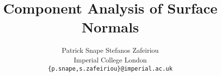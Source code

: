 \documentclass{article} %
\title{Component Analysis of Surface Normals}
\author{
Patrick Snape \qquad Stefanos Zafeiriou\\
Imperial College London\\
\texttt{\{p.snape,s.zafeiriou\}@imperial.ac.uk}
}
\begin{document}
\maketitle





{\small


}
\end{document}
